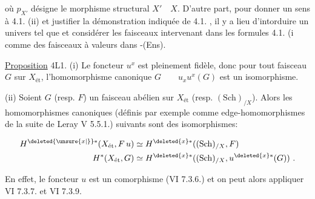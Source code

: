 où $p_{X'}$ désigne le morphisme structural $X'\quad X$. D'autre part, pour donner un sens à 4.1. (ii) et justifier la démonstration indiquée de 4.1. , il y a lieu d'intorduire un univers \quad tel que \qquad \unsure{,|;} et considérer les faisceaux intervenant dans les formules 4.1. (i comme des faisceaux à valeurs dans \quad -(Ens).

\uline{Proposition} 4L1. (i) Le foncteur $u^x$ est pleinement fidèle, donc pour tout faisceau $G$ sur $X_{\text{ét}}$, l'homomorphisme canonique $G\qquad u_x u^x(G)$ est un isomorphisme.

(ii) Soient $G$ (resp. $F$) un faisceau abélien sur $X_{\text{ét}}$ (resp. $(\mathrm{Sch})_{/X}$). Alors les homomorphismes canoniques (définis par exemple comme edge-homomorphismes de la suite  de Leray V 5.5.1.) suivants sont des isomorphismes:

\[
\begin{aligned}
H^{\deleted{\unsure{x|{}}}*}(X_{\text{ét}},F\,u)&\simeq H^{\deleted{x}*}((\mathrm{Sch})_{/X},F)\\
H^*(X_{\text{ét}},G)&\simeq H^{\deleted{x}*}((\mathrm{Sch})_{/X},u^{\deleted{x}*}(G))\ .
\end{aligned}
\]

En effet, le foncteur $u$ est un comorphisme (VI 7.3.6.) et on peut alors appliquer VI 7.3.7. et VI 7.3.9.

